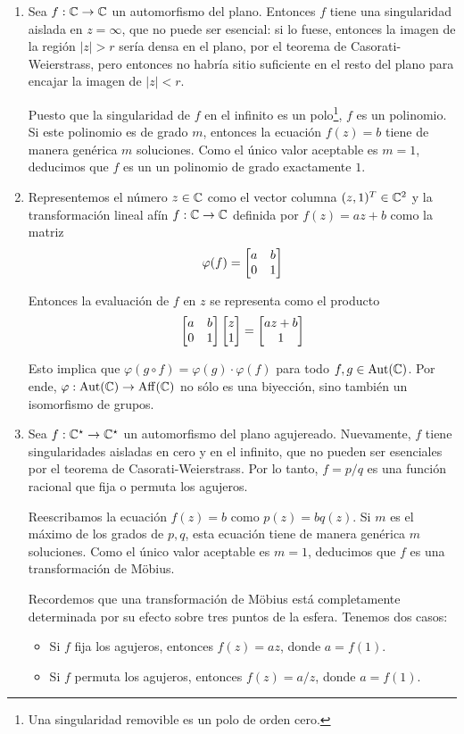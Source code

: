 \begin{solution}
\leavevmode
\begin{enumerate}[label=\alph*)]
    \item Sea $f : \mathbb C \to \mathbb C$ un automorfismo del plano. Entonces $f$ tiene una singularidad aislada en $z = \infty$, que no puede ser esencial: si lo fuese, entonces la imagen de la región $|z| > r$ sería densa en el plano, por el teorema de Casorati-Weierstrass, pero entonces no habría sitio suficiente en el resto del plano para encajar la imagen de $|z| < r$.
    
    Puesto que la singularidad de $f$ en el infinito es un polo\footnote{Una singularidad removible es un polo de orden cero.}, $f$ es un polinomio. Si este polinomio es de grado $m$, entonces la ecuación $f(z) = b$ tiene de manera genérica $m$ soluciones. Como el único valor aceptable es $m = 1$, deducimos que $f$ es un un polinomio de grado exactamente $1$.
    
    \item Representemos el número $z \in \mathbb C$ como el vector columna $(z,1)^T \in \mathbb C^2$ y la transformación lineal afín $f : \mathbb C \to \mathbb C$ definida por $f(z) = az + b$ como la matriz
    $$\varphi(f) = \begin{bmatrix} a & b \\ 0 & 1 \end{bmatrix}$$
    
    Entonces la evaluación de $f$ en $z$ se representa como el producto
    $$\begin{bmatrix} a & b \\ 0 & 1 \end{bmatrix} \begin{bmatrix} z \\ 1 \end{bmatrix} = \begin{bmatrix} az + b \\ 1 \end{bmatrix}$$
    
    Esto implica que $\varphi(g \circ f) = \varphi(g) \cdot \varphi(f)$ para todo $f, g \in \operatorname{Aut}(\mathbb C)$. Por ende, $\varphi : \operatorname{Aut}(\mathbb C) \to \operatorname{Aff}(\mathbb C)$ no sólo es una biyección, sino también un isomorfismo de grupos.
    
    \item Sea $f : \mathbb C^\star \to \mathbb C^\star$ un automorfismo del plano agujereado. Nuevamente, $f$ tiene singularidades aisladas en cero y en el infinito, que no pueden ser esenciales por el teorema de Casorati-Weierstrass. Por lo tanto, $f = p/q$ es una función racional que fija o permuta los agujeros.
    
    Reescribamos la ecuación $f(z) = b$ como $p(z) = bq(z)$. Si $m$ es el máximo de los grados de $p, q$, esta ecuación tiene de manera genérica $m$ soluciones. Como el único valor aceptable es $m = 1$, deducimos que $f$ es una transformación de Möbius.
    
    Recordemos que una transformación de Möbius está completamente determinada por su efecto sobre tres puntos de la esfera. Tenemos dos casos:
    \begin{itemize}
        \item Si $f$ fija los agujeros, entonces $f(z) = az$, donde $a = f(1)$.
        \item Si $f$ permuta los agujeros, entonces $f(z) = a/z$, donde $a = f(1)$.
    \end{itemize}
    

\end{enumerate}
\end{solution}
